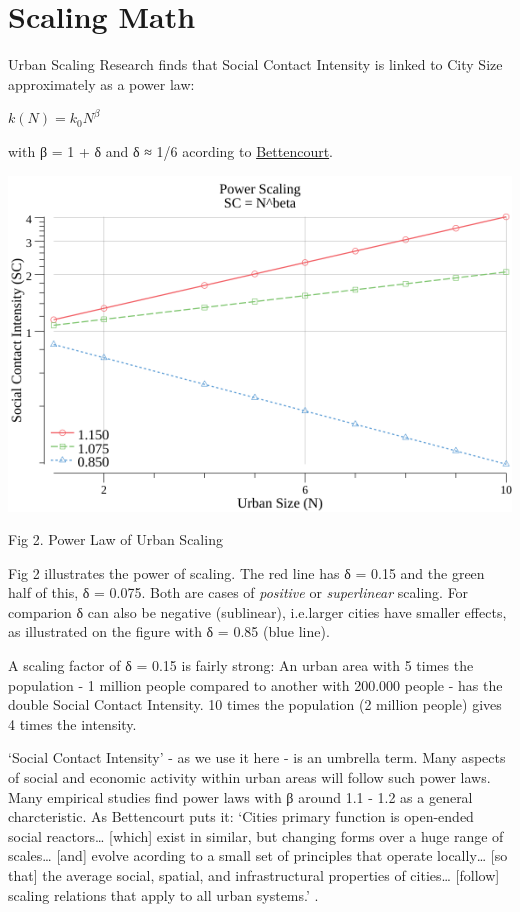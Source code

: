 \documentclass[
]{book}
\begin{document}
\hypertarget{scaling-math}{%
\section{Scaling Math}\label{scaling-math}}

Urban Scaling Research finds that Social Contact Intensity is linked to City Size approximately
as a power law:

\(k(N) = k_{0} N^β\)

with β = 1 + δ and δ ≈ 1/6 acording to \href{https://science.sciencemag.org/content/340/6139/1438}{Bettencourt}.

\includegraphics{fig/scale_log.png}

Fig 2. Power Law of Urban Scaling

Fig 2 illustrates the power of scaling. The red line has δ = 0.15 and the green half of this,
δ = 0.075. Both are cases of \emph{positive} or \emph{superlinear} scaling. For comparion δ can also be
negative (sublinear), i.e.larger cities have smaller effects,
as illustrated on the figure with δ = 0.85 (blue line).

A scaling factor of δ = 0.15 is fairly strong: An urban area with 5 times the population -
1 million people compared to another with 200.000 people - has the double Social Contact Intensity.
10 times the population (2 million people) gives 4 times the intensity.

`Social Contact Intensity' - as we use it here - is an umbrella term.
Many aspects of social and economic activity within urban areas will follow such power laws.
Many empirical studies find power laws with β around 1.1 - 1.2 as a general charcteristic.
As Bettencourt puts it: `Cities primary function is open-ended social reactors\ldots{}
{[}which{]} exist in similar, but changing forms over a huge range of scales\ldots{}
{[}and{]} evolve acording to a small set of principles that operate locally\ldots{}
{[}so that{]} the average social, spatial, and infrastructural properties of cities\ldots{}
{[}follow{]} scaling relations that apply to all urban systems.' .
\end{document}
